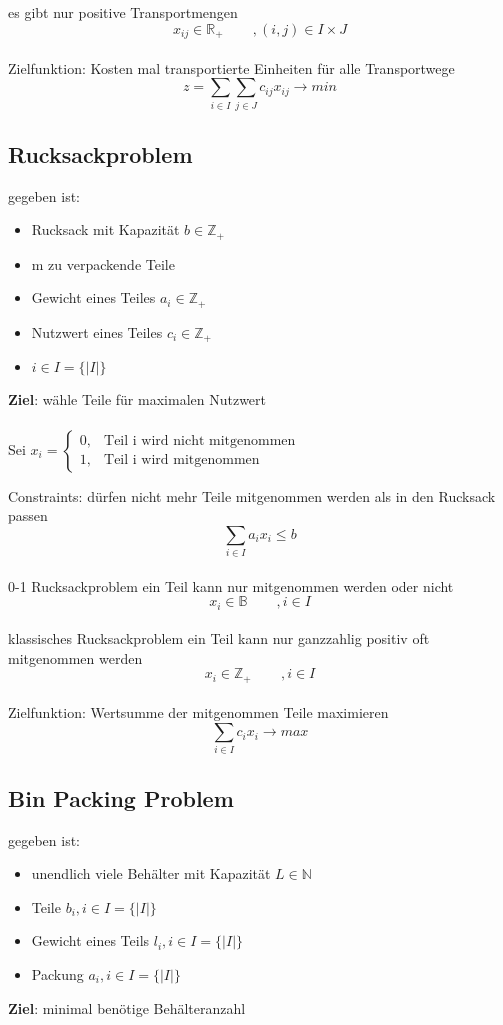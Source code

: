 \documentclass[12pt,a4paper, hyperref]{article}
\begin{document}
\flushleft es gibt nur positive Transportmengen
\[ x_{ij} \in \mathbb{R}_{+}\hspace{25pt} , (i,j) \in I \times J \]\\

Zielfunktion:
Kosten mal transportierte Einheiten für alle Transportwege\\
\[z= \sum_{i\in I} \sum_{j\in J} c_{ij}x_{ij} \rightarrow min \]

\subsection{Rucksackproblem}
gegeben ist:
\begin{itemize}
\item Rucksack mit Kapazität $b \in \mathbb{Z}_+$
\item m zu verpackende Teile
\item Gewicht eines Teiles $a_i \in \mathbb{Z}_+$
\item Nutzwert eines Teiles $c_i \in \mathbb{Z}_+$
\item $i \in I = \{|I|\}$
\end{itemize}
\textbf{Ziel}: wähle Teile für maximalen Nutzwert\\
\hspace{1pt}\\

Sei $x_i = \begin{cases}
0, & \text{Teil i wird nicht mitgenommen} \\
1, & \text{Teil i wird mitgenommen}
\end{cases}$

\flushleft Constraints:
\flushleft dürfen nicht mehr Teile mitgenommen werden als in den Rucksack passen
\[ \sum_{i\in I} a_{i}x_{i} \leq b \]\\

0-1 Rucksackproblem
\flushleft ein Teil kann nur mitgenommen werden oder nicht
\[ x_i \in \mathbb{B}\hspace{25pt} , i\in I \]\\

klassisches Rucksackproblem
\flushleft ein Teil kann nur ganzzahlig positiv oft mitgenommen werden
\[ x_i \in \mathbb{Z}_+\hspace{25pt} , i\in I \]\\

Zielfunktion: Wertsumme der mitgenommen Teile maximieren
\[ \sum_{i\in I}c_{i}x_{i} \rightarrow max  \]

\subsection{Bin Packing Problem}
gegeben ist:
\begin{itemize}
\item unendlich viele Behälter mit Kapazität $L \in \mathbb{N}$
\item Teile $b_i, i \in I = \{|I|\}$
\item Gewicht eines Teils $l_i, i \in I = \{|I|\}$
\item Packung $a_i, i \in I = \{|I|\}$
\end{itemize}
\textbf{Ziel}: minimal benötige Behälteranzahl\\
\end{document}
